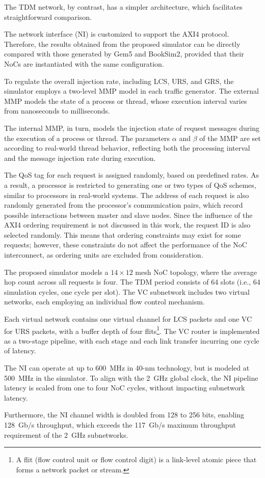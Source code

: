 The TDM network, by contrast, has a simpler architecture, which facilitates straightforward comparison. 

The network interface (NI) is customized to support the AXI4 protocol. Therefore, the results obtained from the proposed simulator can be directly compared with those generated by Gem5 and BookSim2, provided that their NoCs are instantiated with the same configuration.

To regulate the overall injection rate, including \ac{LCS}, \ac{URS}, and \ac{GRS}, the simulator employs a two-level \ac{MMP} model in each traffic generator. The external MMP models the state of a process or thread, whose execution interval varies from nanoseconds to milliseconds. 

The internal MMP, in turn, models the injection state of request messages during the execution of a process or thread. The parameters $\alpha$ and $\beta$ of the MMP are set according to real-world thread behavior, reflecting both the processing interval and the message injection rate during execution. 

The QoS tag for each request is assigned randomly, based on predefined rates. As a result, a processor is restricted to generating one or two types of QoS schemes, similar to processors in real-world systems. 
The address of each request is also randomly generated from the processor’s communication pairs, which record possible interactions between master and slave nodes. 
Since the influence of the AXI4 ordering requirement is not discussed in this work, the request ID is also selected randomly. This means that ordering constraints may exist for some requests; however, these constraints do not affect the performance of the NoC interconnect, as ordering units are excluded from consideration.

The proposed simulator models a $14 \times 12$ mesh NoC topology, where the average hop count across all requests is four. The TDM period consists of 64 slots (i.e., 64 simulation cycles, one cycle per slot). The VC subnetwork includes two virtual networks, each employing an individual flow control mechanism.

Each virtual network contains one virtual channel for LCS packets and one VC for URS packets, with a buffer depth of four flits\footnote{A flit (flow control unit or flow control digit) is a link-level atomic piece that forms a network packet or stream.}. The VC router is implemented as a two-stage pipeline, with each stage and each link transfer incurring one cycle of latency. 

The NI can operate at up to 600~MHz in 40-nm technology, but is modeled at 500~MHz in the simulator. To align with the 2~GHz global clock, the NI pipeline latency is scaled from one to four NoC cycles, without impacting subnetwork latency. 

Furthermore, the NI channel width is doubled from 128 to 256 bits, enabling 128~Gb/s throughput, which exceeds the 117~Gb/s maximum throughput requirement of the 2~GHz subnetworks.
